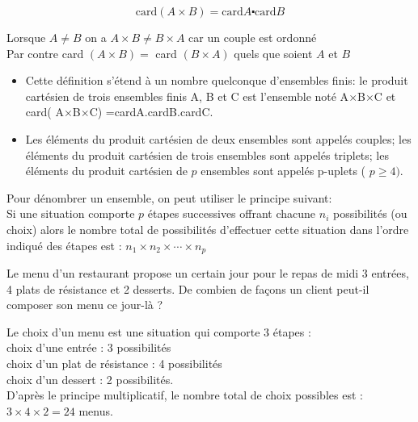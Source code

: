 \begin{theorem}

\[ \textrm{card}( A\times B) = \textrm{card}A \centerdot \textrm{card}B  \]

\end{theorem}


\begin{remark}

Lorsque $ A\neq B $ on a $ A \times B \neq B \times A $ car un couple est ordonné \\Par contre card $( A\times B )=$ card $ (B\times A) $ quels que soient $A $ et $B $
 \begin{itemize}
 \item[\textbullet]  Cette définition s'étend à un nombre quelconque d'ensembles finis:  le produit cartésien de trois ensembles finis A, B et C est  l'ensemble noté A$\times$B$ \times$C  et card( A$\times$B$ \times$C) =cardA.cardB.cardC.
 \item[\textbullet] Les éléments du  produit cartésien  de deux ensembles sont appelés couples; les éléments du  produit cartésien  de trois ensembles sont appelés triplets; les éléments du  produit cartésien de $ p $ ensembles  sont appelés p-uplets \; ( $ p\geq4) $.
  \end{itemize}
 
 \end{remark}
 
 \begin{corollary} 
Pour dénombrer un ensemble, on peut utiliser le principe suivant:\\
Si une situation comporte $ p $  étapes successives offrant chacune $ n_{i} $ possibilités (ou choix) alors le nombre total de possibilités d'effectuer cette situation dans l'ordre indiqué des étapes est :
$   n_{1}\times n_{2} \times \cdots \times n_{p} $
\end{corollary} 

 
 
 \begin{example}

Le  menu d'un restaurant propose un certain jour pour le repas de midi 3 entrées, 4 plats de résistance et 2 desserts. De combien de façons un client peut-il composer son menu ce jour-là ? 

    Le choix d'un menu est une situation qui comporte 3 étapes :\\
 choix d'une entrée : 3 possibilités\\
choix d'un plat de résistance  : 4 possibilités\\
choix d'un dessert : 2 possibilités.\\
D'après le principe multiplicatif, le nombre total de choix possibles est :  $ 3 \times 4 \times 2 = 24$  menus.
 \end{example}
 
